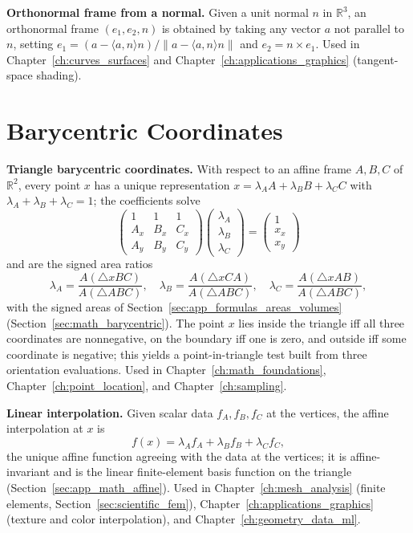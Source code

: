 \medskip\noindent\textbf{Orthonormal frame from a normal.}
Given a unit normal $n$ in $\mathbb{R}^3$, an orthonormal frame
$(e_1, e_2, n)$ is obtained by taking any vector $a$ not parallel to $n$,
setting $e_1 = (a - \langle a, n\rangle n)/\|a - \langle a, n\rangle n\|$
and $e_2 = n \times e_1$. Used in Chapter~\ref{ch:curves_surfaces} and
Chapter~\ref{ch:applications_graphics} (tangent-space shading).


\section{Barycentric Coordinates}
\label{sec:app_formulas_barycentric}

\medskip\noindent\textbf{Triangle barycentric coordinates.}
With respect to an affine frame $A, B, C$ of $\mathbb{R}^2$, every point
$x$ has a unique representation $x = \lambda_A A + \lambda_B B + \lambda_C C$
with $\lambda_A + \lambda_B + \lambda_C = 1$; the coefficients solve
\[
  \begin{pmatrix} 1 & 1 & 1 \\ A_x & B_x & C_x \\ A_y & B_y & C_y \end{pmatrix}
  \begin{pmatrix} \lambda_A \\ \lambda_B \\ \lambda_C \end{pmatrix}
  = \begin{pmatrix} 1 \\ x_x \\ x_y \end{pmatrix}
\]
and are the signed area ratios
\[
  \lambda_A = \frac{A(\triangle xBC)}{A(\triangle ABC)},
  \quad
  \lambda_B = \frac{A(\triangle xCA)}{A(\triangle ABC)},
  \quad
  \lambda_C = \frac{A(\triangle xAB)}{A(\triangle ABC)},
\]
with the signed areas of Section~\ref{sec:app_formulas_areas_volumes}
(Section~\ref{sec:math_barycentric}). The point $x$ lies inside the
triangle iff all three coordinates are nonnegative, on the boundary iff
one is zero, and outside iff some coordinate is negative; this yields a
point-in-triangle test built from three orientation evaluations. Used in
Chapter~\ref{ch:math_foundations}, Chapter~\ref{ch:point_location}, and
Chapter~\ref{ch:sampling}.

\medskip\noindent\textbf{Linear interpolation.}
Given scalar data $f_A, f_B, f_C$ at the vertices, the affine interpolation
at $x$ is
\[
  f(x) = \lambda_A f_A + \lambda_B f_B + \lambda_C f_C,
\]
the unique affine function agreeing with the data at the vertices; it is
affine-invariant and is the linear finite-element basis function on the
triangle (Section~\ref{sec:app_math_affine}). Used in
Chapter~\ref{ch:mesh_analysis} (finite elements, Section~\ref{sec:scientific_fem}),
Chapter~\ref{ch:applications_graphics} (texture and color interpolation),
and Chapter~\ref{ch:geometry_data_ml}.

